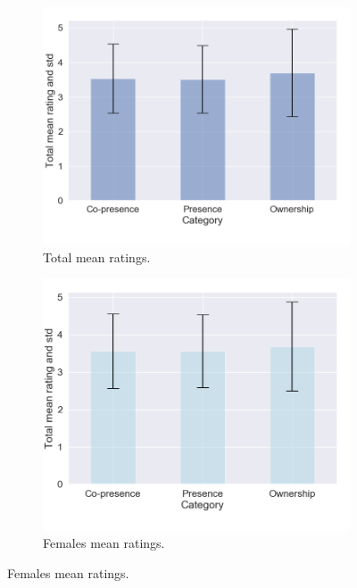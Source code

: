 \begin{figure}[H]
 \centering
 \hspace{-25mm}
 \begin{subfigure}[b]{0.3\textwidth}
 \includegraphics[scale=0.3]{Files/Plots/misc_all_mean.png}
 \caption{Total mean ratings.}
\label{fig:miscAll}
\end{subfigure}
 \hspace{10mm}
\begin{subfigure}[b]{0.3\textwidth}
 \centering
 \includegraphics[scale=0.3]{Files/Plots/misc_all_mean_f.png}
 \caption{Females mean ratings. }
 \label{fig:miscAllFemales}

\end{subfigure}
\end{figure}
